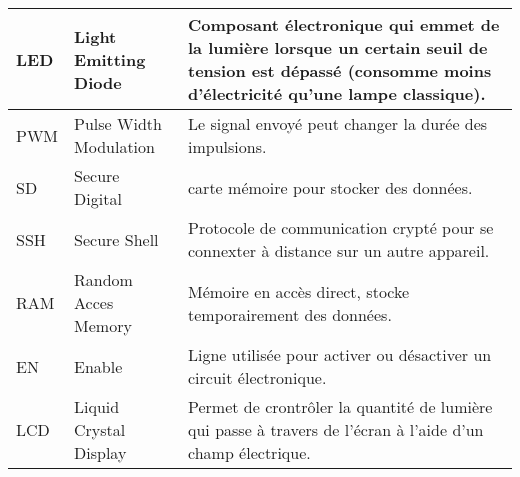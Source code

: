 \begin{table}[ht]
\begin{adjustwidth}{-3cm}{-3cm}
\begin{tabular}{|p{1cm}|p{5cm}|p{10cm}|}
                LED & Light Emitting Diode & Composant électronique qui emmet de la lumière lorsque un certain seuil de tension est dépassé (consomme moins d'électricité qu'une lampe classique).\\
                \hline
                PWM & Pulse Width Modulation & Le signal envoyé peut changer la durée des impulsions. \\     
                \hline
                SD & Secure Digital & carte mémoire pour stocker des données. \\
                \hline
                SSH & Secure Shell & Protocole de communication crypté pour se connexter à distance sur un autre appareil.\\
                \hline
                RAM & Random Acces Memory & Mémoire en accès direct, stocke temporairement des données.\\
                \hline
                EN & Enable & Ligne utilisée pour activer ou désactiver un circuit électronique.\\
                \hline
                LCD & Liquid Crystal Display & Permet de crontrôler la quantité de lumière qui passe à travers de l'écran à l'aide d'un champ électrique.\\
                \hline
            \end{tabular}
        \end{adjustwidth}
    \end{table}
